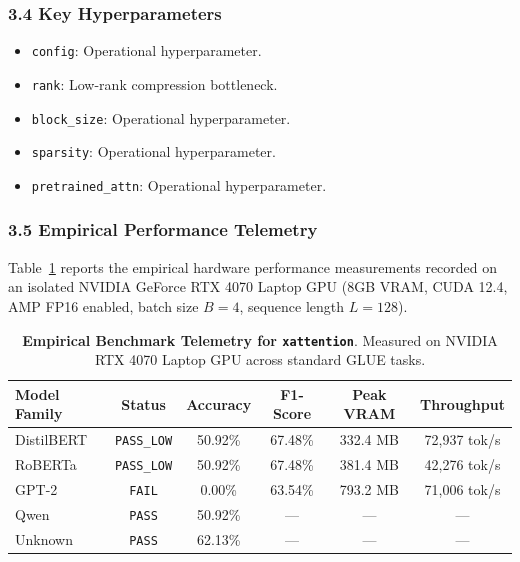 \subsubsection*{3.4 Key Hyperparameters}
\begin{itemize}
    \item \texttt{config}: Operational hyperparameter.
    \item \texttt{rank}: Low-rank compression bottleneck.
    \item \texttt{block\_size}: Operational hyperparameter.
    \item \texttt{sparsity}: Operational hyperparameter.
    \item \texttt{pretrained\_attn}: Operational hyperparameter.
\end{itemize}

\subsubsection*{3.5 Empirical Performance Telemetry}
Table~\ref{tab:telemetry_xattention} reports the empirical hardware performance measurements recorded on an isolated NVIDIA GeForce RTX 4070 Laptop GPU (8GB VRAM, CUDA 12.4, AMP FP16 enabled, batch size $B=4$, sequence length $L=128$).

\begin{table}[h]
\centering
\small
\caption{\textbf{Empirical Benchmark Telemetry for \texttt{xattention}}. Measured on NVIDIA RTX 4070 Laptop GPU across standard GLUE tasks.}
\label{tab:telemetry_xattention}
\begin{tabular*}{\columnwidth}{@{\extracolsep{\fill}}lccccc}
\toprule
\textbf{Model Family} & \textbf{Status} & \textbf{Accuracy} & \textbf{F1-Score} & \textbf{Peak VRAM} & \textbf{Throughput} \\
\midrule
DistilBERT & \texttt{PASS\_LOW} & 50.92\% & 67.48\% & 332.4 MB & 72,937 tok/s \\
RoBERTa & \texttt{PASS\_LOW} & 50.92\% & 67.48\% & 381.4 MB & 42,276 tok/s \\
GPT-2 & \texttt{FAIL} & 0.00\% & 63.54\% & 793.2 MB & 71,006 tok/s \\
Qwen & \texttt{PASS} & 50.92\% & --- & --- & --- \\
Unknown & \texttt{PASS} & 62.13\% & --- & --- & --- \\
\bottomrule
\end{tabular*}
\end{table}

